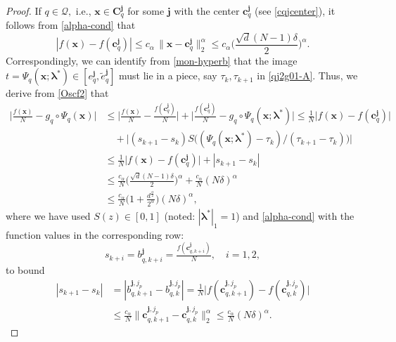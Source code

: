 \documentclass[10pt,a4paper]{amsart}
\newcommand{\bs}[1]{\boldsymbol{#1}}
\begin{document}
\begin{proof}
If $q\in {\mathcal Q},$ i.e.,  $\bs x\in  \bs C_q^{\bs{j}}$  for some $\bs j$ with the center $\bs{c}_{q}^{\bs{j}}$ (see \eqref{cqjcenter}),  it follows from \eqref{alpha-cond}  that
\begin{equation}\label{Oscf2}
|f(\bs{x})-f(\bs{c}_q^{\bs{j}})|\leq c_{\alpha}\,\|\bs{x}-\bs{c}_q^{\bs{j}}\|^{\alpha}_2 \leq c_{\alpha} \Big(\frac{\sqrt{d}(N-1)\delta}{2}\Big)^{\alpha}.
\end{equation}
Correspondingly, we can identify from  \eqref{mon-hyperb} that the image $t=\Psi_q(\bs{x};\bs \lambda^*)\in [e_q^{\bs j}, \tilde e_q^{\bs j}]$ must lie in a piece, say $\tau_k, \tau_{k+1}$ in \eqref{qj2g01-A}.  Thus,   
 we  derive from   \eqref{Oscf2} that 
\begin{equation}\label{Nsquare2}
\begin{split}
\Big|\frac{f(\bs{x})}{N}  -g_q\circ\Psi_q(\bs{x})\Big| & \le  \Big|\frac {f(\bs{x})}N - \frac   {f(\bs{c}_q^{\bs{j}})} N\Big|+\Big|\frac   {f(\bs{c}_q^{\bs{j}})} N-g_q\circ\Psi_q(\bs{x};\bs \lambda^*)\Big| \le \frac 1 N \big|{f(\bs{x})}-   {f(\bs{c}_q^{\bs{j}})} \big|\\[4pt]
&\quad +\big|(s_{k+1}-s_k) S\big((\Psi_q(\bs x;\bs \lambda^*)-\tau_k)/(\tau_{k+1}-\tau_k)\big)\big|\\[4pt]
&\le \frac 1 N \big|{f(\bs{x})}-   {f(\bs{c}_q^{\bs{j}})} \big|+|s_{k+1}-s_k | \\[4pt]
&\le  \frac{c_{\alpha}} N \Big(\frac{\sqrt{d}(N-1)\delta}{2}\Big)^{\alpha}+ \frac{c_{\alpha}}{N} (N\delta)^{\alpha}
\\[4pt]
&\leq \frac{c_{\alpha}}{N}  \Big(1+\frac{d^{\frac{\alpha}{2}}} {2^{\alpha}}\Big)(N\delta)^{\alpha},
\end{split}
\end{equation}
where we have used $S(z)\in [0,1]$ (noted: $|\bs \lambda^*|_1=1$) and  \eqref{alpha-cond} with the function values in the corresponding row:  
$$s_{k+i}=b_{q,k+i}^{\bs j}=\tfrac{f(\bs{c}_{q,k+i}^{\bs{j}})}{N},\quad i=1,2,$$  to bound
\begin{equation}\label{bqjest}
\begin{split}
|s_{k+1}-s_k | &=|b_{q,k+1}^{\bs j,j_p}-b_{q,k}^{\bs j,j_p}|=\frac 1 N\big|f(\bs c_{q,k+1}^{\bs j,j_p})-f(\bs c_{q,k}^{\bs j,j_p})\big|\\[4pt]
  &\le \frac {c_{\alpha}} N \big\|\bs c_{q,k+1}^{\bs j,j_p}-\bs c_{q,k}^{\bs j,j_p}\big\|_2^\alpha  \leq \frac{c_{\alpha}}{N} (N\delta)^{\alpha}.
  \end{split}
\end{equation}

\end{proof}
\end{document}
